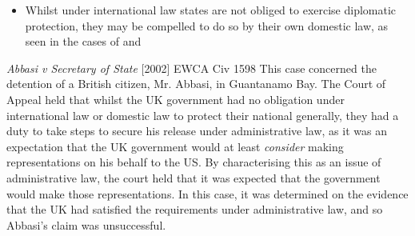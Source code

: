 \begin{itemize}
    \item Whilst under international law states are not obliged to exercise diplomatic protection, they may be compelled to do so by their own domestic law, as seen in the cases of  and 
\end{itemize}

\begin{casedetails}{\textit{Abbasi v Secretary of State} [2002] EWCA Civ 1598}
    \flushleft
    This case concerned the detention of a British citizen, Mr. Abbasi, in Guantanamo Bay. The Court of Appeal held that whilst the UK government had no obligation under international law or domestic law to protect their national generally, they had a duty to take steps to secure his release under administrative law, as it was an expectation that the UK government would at least \textit{consider} making representations on his behalf to the US. By characterising this as an issue of administrative law, the court held that it was expected that the government would make those representations. In this case, it was determined on the evidence that the UK had satisfied the requirements under administrative law, and so Abbasi's claim was unsuccessful.
\end{casedetails}

